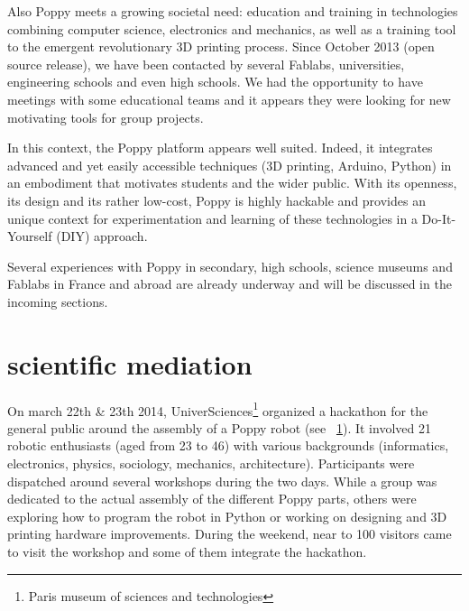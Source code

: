 Also Poppy meets a growing societal need: education and training in technologies combining computer science, electronics and mechanics, as well as a training tool to the emergent revolutionary 3D printing process. Since October 2013 (open source release), we have been contacted by several Fablabs, universities, engineering schools and even high schools. We had the opportunity to have meetings with some educational teams and it appears they were looking for new motivating tools for group projects.

In this context, the Poppy platform appears well suited. Indeed, it integrates advanced and yet easily accessible techniques (3D printing, Arduino, Python) in an embodiment that motivates students and the wider public. With its openness, its design and its rather low-cost, Poppy is highly hackable and provides an unique context for experimentation and learning of these technologies in a Do-It-Yourself (DIY) approach.

Several experiences with Poppy in secondary, high schools, science museums and Fablabs in France and abroad are already underway and will be discussed in the incoming sections.


\section{scientific mediation} %

On march 22th \& 23th 2014, UniverSciences\footnote{Paris museum of sciences and technologies} organized a hackathon for the general public around the assembly of a Poppy robot (see \figurename~\ref{fig:universience_hackathon_orga}). It involved 21 robotic enthusiasts (aged from 23 to 46) with various backgrounds (informatics, electronics, physics, sociology, mechanics, architecture).
Participants were dispatched around several workshops during the two days. While a group was dedicated to the actual assembly of the different Poppy parts, others were exploring how to program the robot in Python or working on designing and 3D printing hardware improvements.
During the weekend, near to 100 visitors came to visit the workshop and some of them integrate the hackathon.

\begin{figure}[]
\centering
    \hfil
    \caption{}
    \label{fig:universience_hackathon_orga}
\end{figure}

